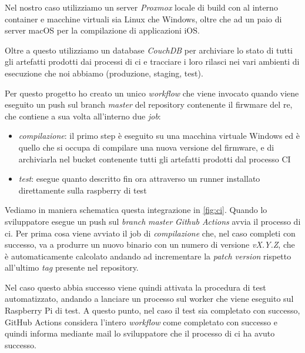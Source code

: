 \documentclass[12pt,a4paper,twoside,titlepage]{book}
\begin{document}
Nel nostro caso utilizziamo un server \textit{Proxmox} locale di build con al interno container e macchine virtuali 
sia Linux che Windows, oltre che ad un paio di server macOS per la compilazione di applicazioni iOS. 

Oltre a questo utilizziamo un database \textit{CouchDB} per archiviare lo stato di tutti 
gli artefatti prodotti dai processi di \acrshort{ci} e tracciare i loro rilasci nei vari ambienti di 
esecuzione che noi abbiamo (produzione, staging, test). 

Per questo progetto ho creato un unico \textit{workflow} che viene invocato quando viene eseguito 
un push sul branch \textit{master} del repository contenente il firwmare del \acrshort{re}, 
che contiene a sua volta all'interno due \textit{job}:
\begin{itemize}
    \item \textit{compilazione}: il primo step è eseguito su una macchina virtuale Windows 
        ed è quello che si occupa di compilare una nuova versione del \gls{firmware}, e di archiviarla
        nel bucket contenente tutti gli artefatti prodotti dal processo CI
    \item \textit{test}: esegue quanto descritto fin ora attraverso un runner installato 
        direttamente sulla raspberry di test 
\end{itemize}

Vediamo in maniera schematica questa integrazione in \autoref{fig:ci}. Quando lo sviluppatore esegue 
un push sul \textit{branch} \textit{master} \textit{Github Actions} avvia il processo di \acrshort{ci}. 
Per prima cosa viene avviato il job di \textit{compilazione} che, nel caso completi con successo, va a 
produrre un nuovo binario con un numero di versione \textit{vX.Y.Z}, che è automaticamente calcolato andando 
ad incrementare la \textit{patch version} rispetto all'ultimo \textit{tag} presente nel repository. 

Nel caso questo abbia successo viene quindi attivata la procedura di test automatizzato, andando a lanciare 
un processo sul worker che viene eseguito sul Raspberry Pi di test. A questo punto, nel caso il test sia 
completato con successo, GitHub Actions considera l'intero \textit{workflow} come completato con successo e 
quindi informa mediante mail lo sviluppatore che il processo di \acrshort{ci} ha avuto successo. 
\end{document}
